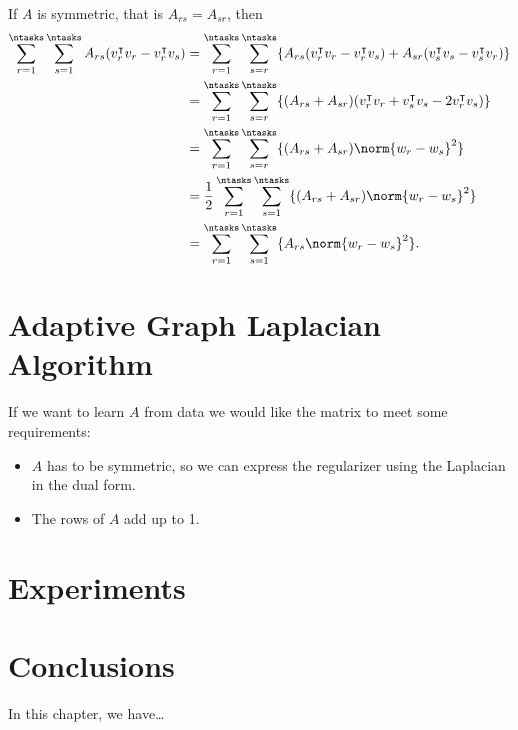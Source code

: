 If $A$ is symmetric, that is $A_{rs} = A_{sr}$, then
\begin{align*}
    \sum_{r=1}^\ntasks \sum_{s=1}^\ntasks A_{rs} (v_r^\intercal v_r - v_r^\intercal v_s) &=
    \sum_{r=1}^\ntasks \sum_{s=r}^\ntasks \lbrace A_{rs}  (v_r^\intercal v_r - v_r^\intercal v_s) + A_{sr} (v_s^\intercal v_s - v_s^\intercal v_r) \rbrace \\
    &=
    \sum_{r=1}^\ntasks \sum_{s=r}^\ntasks \lbrace (A_{rs} + A_{sr})  (v_r^\intercal v_r + v_s^\intercal v_s - 2v_r^\intercal v_s) \rbrace \\
    &=
    \sum_{r=1}^\ntasks \sum_{s=r}^\ntasks \lbrace (A_{rs} + A_{sr})  \norm{w_r - w_s}^2 \rbrace \\
    &=
    \frac{1}{2} \sum_{r=1}^\ntasks \sum_{s=1}^\ntasks \lbrace (A_{rs} + A_{sr})  \norm{w_r - w_s}^2 \rbrace \\
    &=
     \sum_{r=1}^\ntasks \sum_{s=1}^\ntasks \lbrace A_{rs}  \norm{w_r - w_s}^2 \rbrace .\\
\end{align*}
\section{Adaptive Graph Laplacian Algorithm}

If we want to learn $A$ from data we would like the matrix to meet some requirements:
\begin{itemize}
    \item $A$ has to be symmetric, so we can express the regularizer using the Laplacian in the dual form.
    \item The rows of $A$ add up to 1. 
\end{itemize} 

\section{Experiments}

\section{Conclusions}\label{sec-conclusions-4}

In this chapter, we have\dots
